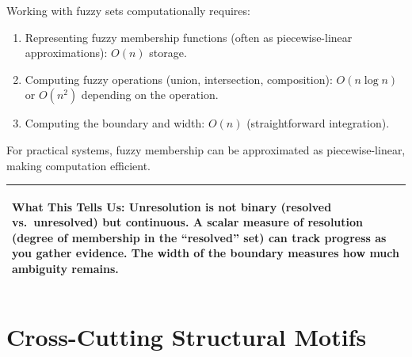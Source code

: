 \documentclass[11pt,letterpaper]{article}
\theoremstyle{definition}
\theoremstyle{remark}
\newenvironment{insightbox}{%
  \vspace{0.3cm}%
  \noindent\begin{tabular}{|p{\dimexpr\textwidth-4\tabcolsep-2\arrayrulewidth}|}
  \hline
  \small\itshape\color{accent}
}{%
  \\ \hline
  \end{tabular}
  \vspace{0.3cm}
}
\begin{document}
Working with fuzzy sets computationally requires:
\begin{enumerate}
\item Representing fuzzy membership functions (often as piecewise-linear approximations): $O(n)$ storage.
\item Computing fuzzy operations (union, intersection, composition): $O(n \log n)$ or $O(n^2)$ depending on the operation.
\item Computing the boundary and width: $O(n)$ (straightforward integration).
\end{enumerate}

For practical systems, fuzzy membership can be approximated as piecewise-linear, making computation efficient.

\begin{insightbox}
\textbf{What This Tells Us:} Unresolution is not binary (resolved vs.\ unresolved) but continuous. A scalar measure of resolution (degree of membership in the ``resolved'' set) can track progress as you gather evidence. The width of the boundary measures how much ambiguity remains.
\end{insightbox}

\newpage

\section{Cross-Cutting Structural Motifs}
\label{sec:motifs}

\vspace{0.3cm}
\end{document}
